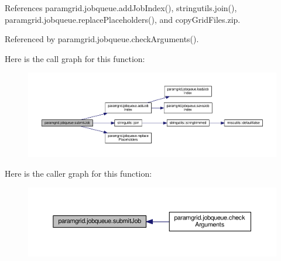 References paramgrid.\+jobqueue.\+add\+Job\+Index(), stringutils.\+join(), paramgrid.\+jobqueue.\+replace\+Placeholders(), and copy\+Grid\+Files.\+zip.



Referenced by paramgrid.\+jobqueue.\+check\+Arguments().

Here is the call graph for this function\+:
\nopagebreak
\begin{figure}[H]
\begin{center}
\leavevmode
\includegraphics[width=350pt]{namespaceparamgrid_1_1jobqueue_a50c5e49392f8b76bbe9c440187f9cfb5_cgraph}
\end{center}
\end{figure}
Here is the caller graph for this function\+:
\nopagebreak
\begin{figure}[H]
\begin{center}
\leavevmode
\includegraphics[width=350pt]{namespaceparamgrid_1_1jobqueue_a50c5e49392f8b76bbe9c440187f9cfb5_icgraph}
\end{center}
\end{figure}
